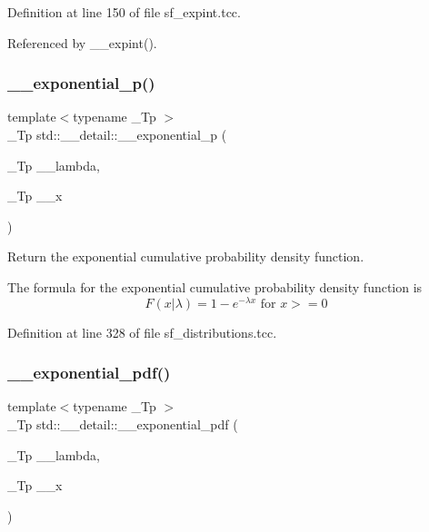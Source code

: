 Definition at line 150 of file sf\+\_\+expint.\+tcc.



Referenced by \+\_\+\+\_\+expint().

\mbox{\label{namespacestd_1_1____detail_a0b0c47fc902a5df5bce1ce07eef6ec7b}} 
\subsubsection{\texorpdfstring{\+\_\+\+\_\+exponential\+\_\+p()}{\_\_exponential\_p()}}
{\footnotesize\ttfamily template$<$typename \+\_\+\+Tp $>$ \\
\+\_\+\+Tp std\+::\+\_\+\+\_\+detail\+::\+\_\+\+\_\+exponential\+\_\+p (\begin{DoxyParamCaption}\item[{\+\_\+\+Tp}]{\+\_\+\+\_\+lambda,  }\item[{\+\_\+\+Tp}]{\+\_\+\+\_\+x }\end{DoxyParamCaption})}



Return the exponential cumulative probability density function. 

The formula for the exponential cumulative probability density function is \[ F(x|\lambda) = 1 - e^{-\lambda x} \mbox{ for } x >= 0 \] 

Definition at line 328 of file sf\+\_\+distributions.\+tcc.

\mbox{\label{namespacestd_1_1____detail_add35fd0c4c00f412c0fab7b6018ce2cd}} 
\subsubsection{\texorpdfstring{\+\_\+\+\_\+exponential\+\_\+pdf()}{\_\_exponential\_pdf()}}
{\footnotesize\ttfamily template$<$typename \+\_\+\+Tp $>$ \\
\+\_\+\+Tp std\+::\+\_\+\+\_\+detail\+::\+\_\+\+\_\+exponential\+\_\+pdf (\begin{DoxyParamCaption}\item[{\+\_\+\+Tp}]{\+\_\+\+\_\+lambda,  }\item[{\+\_\+\+Tp}]{\+\_\+\+\_\+x }\end{DoxyParamCaption})}



